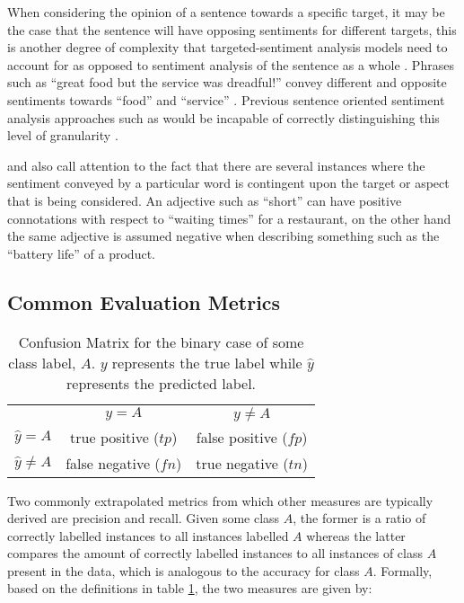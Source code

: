 \documentclass[../../fyp.tex]{subfiles}
\begin{document}
When considering the opinion of a sentence towards a specific target, it may be the case that the sentence will have opposing sentiments for different targets, this is another degree of complexity that targeted-sentiment analysis models need to account for as opposed to sentiment analysis of the sentence as a whole \citep{tang}. Phrases such as \enquote{great food but the service was dreadful!} convey different and opposite sentiments towards \enquote{food} and \enquote{service} \citep{tang2016}. Previous sentence oriented sentiment analysis approaches such as \citep{socher2011,appel2016} would be incapable of correctly distinguishing this level of granularity \citep{chen2017}.

\citet{dehongma2017} and \citet{wang2018} also call attention to the fact that there are several instances where the sentiment conveyed by a particular word is contingent upon the target or aspect that is being considered. An adjective such as \enquote{short} can have positive connotations with respect to \enquote{waiting times} for a restaurant, on the other hand the same adjective is assumed negative when describing something such as the \enquote{battery life} of a product.

\subsection{Common Evaluation Metrics}\label{sec:eval_metrics}
\begin{table}[h!]
	\centering
	\begin{tabular}{||l c c||}
		\hline
		                 & $y=A$                 & $y\neq{A}$            \\ [0.5ex]
		$\hat{y}=A$      & true positive ($tp$)  & false positive ($fp$) \\
		$\hat{y}\neq{A}$ & false negative ($fn$) & true negative ($tn$)  \\
		\hline
	\end{tabular}
	\caption{Confusion Matrix for the binary case of some class label, $A$. $y$ represents the true label while $\hat{y}$ represents the predicted label.}
	\label{table:confusion_matrix}
\end{table}

Two commonly extrapolated metrics from which other measures are typically derived are precision and recall. Given some class $A$, the former is a ratio of correctly labelled instances to all instances labelled $A$ whereas the latter compares the amount of correctly labelled instances to all instances of class $A$ present in the data, which is analogous to the accuracy for class $A$. Formally, based on the definitions in table \ref{table:confusion_matrix}, the two measures are given by:
\end{document}
